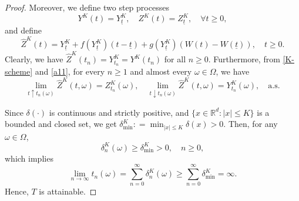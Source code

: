 \documentclass[preprint,12pt,compress]{elsarticle}
\begin{document}
\begin{proof}
Moreover, we define two step processes  
\begin{equation}  \label{a22}
	{Y^K}(t) = Y_{\underline{t}}^K, \quad {Z^K}(t) = Z_{\underline{t}}^K, \quad \forall t \ge 0, 
\end{equation}
and define
\begin{equation}  \label{a11}
	{{\hat{Z}}^K}(t) = Y_{\underline{t}}^K + f(Y_{\underline{t}}^K)(t - \underline{t}) + g(Y_{\underline{t}}^K)(W(t) - W(\underline{t})), \quad  t \ge 0.
\end{equation}
Clearly, we have ${{\hat{Z}}^K}(t_n) = Y_{t_n}^K = {Y^K}(t_n)$ for all $n\ge 0$. Furthermore, from \eqref{K-scheme} and \eqref{a11}, for every $n \ge 1$ and almost every $\omega \in \Omega$, we have
\begin{equation} \label{a34}
	\mathop {\lim }\limits_{t \uparrow {t_n}(\omega)} {{\hat Z}^K}(t, \omega) = Z_{{t_n}}^K (\omega),\quad \mathop {\lim }\limits_{t \downarrow {t_n} (\omega)} {{\hat Z}^K}(t, \omega) = Y_{{t_n}}^K (\omega),\quad \text{a.s.}
\end{equation}
 
Since $\delta ( \cdot )$ is continuous and strictly positive, and $\{ {x \in {\mathbb{R}^d}:\left| x \right| \le K} \}$ is a bounded and closed set, we get $\delta _{\min }^{K}: = {\min _{|x| \le K}}{\delta  }(x) > 0$. Then, for any $\omega \in \Omega$,
\begin{equation*}
	 \delta _n^{K }(\omega ) \ge \delta _{\min }^{K } > 0, \quad  n \ge 0,
\end{equation*}
which implies
\begin{equation*}
	\mathop {\lim }\limits_{n \to \infty } {t_n}(\omega ) = \sum\limits_{n = 0}^\infty  {{\delta _n^{K }}(\omega )}  \ge \sum\limits_{n = 0}^\infty  {\delta _{\min }^{K}}  = \infty .
\end{equation*}
Hence, $T$ is attainable. 


\end{proof}
\end{document}
